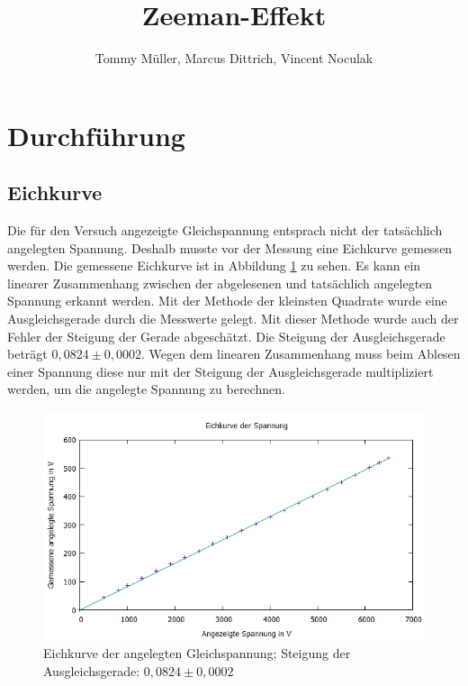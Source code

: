 \documentclass[10pt,a4paper]{article}
\author{Tommy Müller, Marcus Dittrich, Vincent Noculak}
\title{Zeeman-Effekt}
\begin{document}
\maketitle
\newpage
\tableofcontents
\newpage

\section{Durchführung}

\subsection{Eichkurve}

Die für den Versuch angezeigte Gleichspannung entsprach nicht der tatsächlich angelegten Spannung. Deshalb musste vor der Messung eine Eichkurve gemessen werden. Die gemessene Eichkurve ist in Abbildung \ref{eichkurve1} zu sehen. Es kann ein linearer Zusammenhang zwischen der abgelesenen und tatsächlich angelegten Spannung erkannt werden. Mit der Methode der kleinsten Quadrate wurde eine Ausgleichsgerade durch die Messwerte gelegt. Mit dieser Methode wurde auch der Fehler der Steigung der Gerade abgeschätzt. Die Steigung der Ausgleichsgerade beträgt $0,0824 \pm 0,0002$. Wegen dem linearen Zusammenhang muss beim Ablesen einer Spannung diese nur mit der Steigung der Ausgleichsgerade multipliziert werden, um die angelegte Spannung zu berechnen.

\begin{figure}[h]
	\includegraphics[scale = 0.7]{eichkurve.png}
	\centering
	\caption{Eichkurve der angelegten Gleichspannung; Steigung der Ausgleichsgerade: $0,0824 \pm 0,0002$}
	\label{eichkurve1}
\end{figure}
\end{document}
